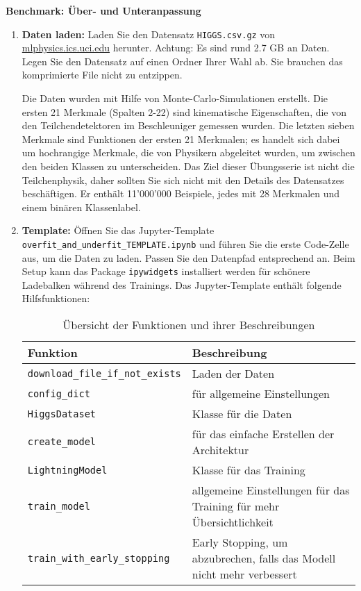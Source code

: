 \documentclass[11pt,a4paper,headinclude]{scrartcl}
\begin{document}
\begin{Aufgabe} \textbf{Benchmark: Über- und Unteranpassung}
	\label{ex:preprocessing}

	
	\begin{enumerate}
		\item \textbf{Daten laden:} Laden Sie den Datensatz \texttt{HIGGS.csv.gz} von \href{http://mlphysics.ics.uci.edu/data/higgs/}{mlphysics.ics.uci.edu} herunter. Achtung: Es sind rund 2.7 GB an Daten. Legen Sie den Datensatz auf einen Ordner Ihrer Wahl ab. Sie brauchen das komprimierte File nicht zu entzippen.
		
		Die Daten wurden mit Hilfe von Monte-Carlo-Simulationen erstellt. Die ersten 21 Merkmale (Spalten 2-22) sind kinematische Eigenschaften, die von den Teilchendetektoren im Beschleuniger gemessen wurden. Die letzten sieben Merkmale sind Funktionen der ersten 21 Merkmalen; es handelt sich dabei um hochrangige Merkmale, die von Physikern abgeleitet wurden, um zwischen den beiden Klassen zu unterscheiden. Das Ziel dieser Übungsserie ist nicht die Teilchenphysik, daher sollten Sie sich nicht mit den Details des Datensatzes beschäftigen. Er enthält 11'000'000 Beispiele, jedes mit 28 Merkmalen und einem binären Klassenlabel.
		
				
		\item \textbf{Template:} Öffnen Sie das Jupyter-Template\\ \texttt{overfit\_and\_underfit\_TEMPLATE.ipynb} und führen Sie die erste Code-Zelle aus, um die Daten zu laden. Passen Sie den Datenpfad entsprechend an. Beim Setup kann das Package \texttt{ipywidgets} installiert werden für schönere Ladebalken während des Trainings. Das Jupyter-Template enthält folgende Hilfsfunktionen:
		
	\begin{table}[H]
		\centering
		\begin{tabular}{l p{10cm}}
			\hline
			\textbf{Funktion} & \textbf{Beschreibung} \\
			\hline
			\texttt{download\_file\_if\_not\_exists} & Laden der Daten \\
			\texttt{config\_dict} & für allgemeine Einstellungen \\
			\texttt{HiggsDataset} & Klasse für die Daten \\
			\texttt{create\_model} & für das einfache Erstellen der Architektur \\
			\texttt{LightningModel} & Klasse für das Training \\
			\texttt{train\_model} & allgemeine Einstellungen für das Training für mehr Übersichtlichkeit \\
			\texttt{train\_with\_early\_stopping} & Early Stopping, um abzubrechen, falls das Modell nicht mehr verbessert \\
			\hline
		\end{tabular}
		\caption{Übersicht der Funktionen und ihrer Beschreibungen}
		\label{tab:functions}
	\end{table}


\end{enumerate}
\end{Aufgabe}
\end{document}
